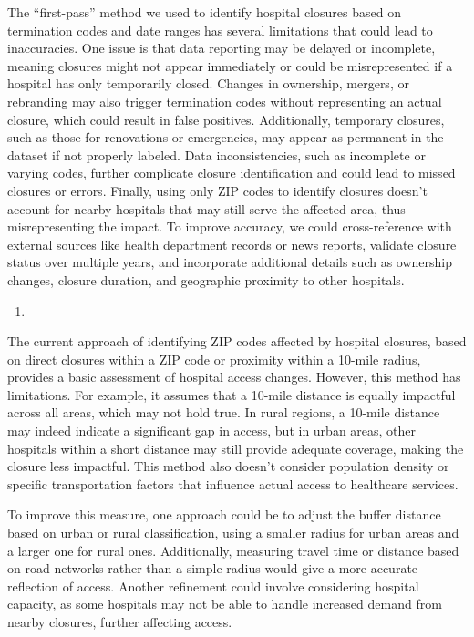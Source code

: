 \documentclass[
  letterpaper,
  DIV=11,
  numbers=noendperiod]{scrartcl}
\providecommand{\tightlist}{%
  \setlength{\itemsep}{0pt}\setlength{\parskip}{0pt}}\usepackage{longtable,booktabs,array}
\begin{document}
The ``first-pass'' method we used to identify hospital closures based on
termination codes and date ranges has several limitations that could
lead to inaccuracies. One issue is that data reporting may be delayed or
incomplete, meaning closures might not appear immediately or could be
misrepresented if a hospital has only temporarily closed. Changes in
ownership, mergers, or rebranding may also trigger termination codes
without representing an actual closure, which could result in false
positives. Additionally, temporary closures, such as those for
renovations or emergencies, may appear as permanent in the dataset if
not properly labeled. Data inconsistencies, such as incomplete or
varying codes, further complicate closure identification and could lead
to missed closures or errors. Finally, using only ZIP codes to identify
closures doesn't account for nearby hospitals that may still serve the
affected area, thus misrepresenting the impact. To improve accuracy, we
could cross-reference with external sources like health department
records or news reports, validate closure status over multiple years,
and incorporate additional details such as ownership changes, closure
duration, and geographic proximity to other hospitals.

\begin{enumerate}
\def\labelenumi{\arabic{enumi}.}
\setcounter{enumi}{1}
\tightlist
\item
\end{enumerate}

The current approach of identifying ZIP codes affected by hospital
closures, based on direct closures within a ZIP code or proximity within
a 10-mile radius, provides a basic assessment of hospital access
changes. However, this method has limitations. For example, it assumes
that a 10-mile distance is equally impactful across all areas, which may
not hold true. In rural regions, a 10-mile distance may indeed indicate
a significant gap in access, but in urban areas, other hospitals within
a short distance may still provide adequate coverage, making the closure
less impactful. This method also doesn't consider population density or
specific transportation factors that influence actual access to
healthcare services.

To improve this measure, one approach could be to adjust the buffer
distance based on urban or rural classification, using a smaller radius
for urban areas and a larger one for rural ones. Additionally, measuring
travel time or distance based on road networks rather than a simple
radius would give a more accurate reflection of access. Another
refinement could involve considering hospital capacity, as some
hospitals may not be able to handle increased demand from nearby
closures, further affecting access.
\end{document}
